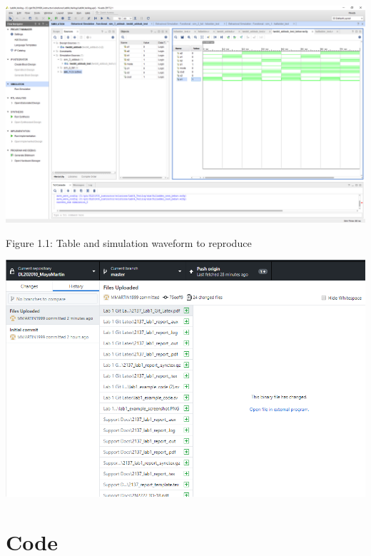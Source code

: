 \documentclass[11pt]{article}
\newcommand{\Verilog}[2][]{%
	
}
\begin{document}
\begin{center}
	\includegraphics[width=1.0\textwidth, trim=19cm 15cm .5cm 4cm,clip]{lab1_example_screenshot.PNG}
\end{center}	
\begin{center}
Figure 1.1: Table and simulation waveform to reproduce 
\end{center}
\begin{center}
	\includegraphics[width=1\textwidth, trim=.1cm .5cm .1cm .1cm,clip]{Screenshot.PNG}
\end{center}	
	
\section*{Code}

\Verilog[caption=File-included Verilog code
example,label=code:file_ex]{lab1_example_code.sv}
\end{document}
